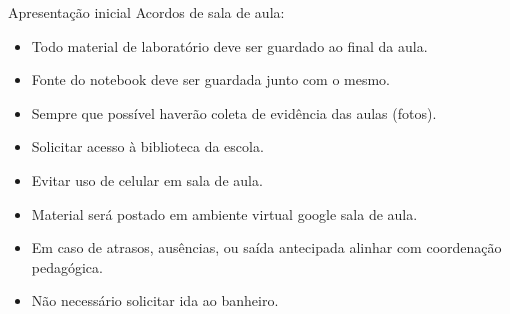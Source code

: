

\begin{frame}{Apresentação inicial}
    Acordos de sala de aula:
    \begin{itemize}
        \item Todo material de laboratório deve ser guardado ao final da aula.
        \item Fonte do notebook deve ser guardada junto com o mesmo.
        \item Sempre que possível haverão coleta de evidência das aulas (fotos).
        \item Solicitar acesso à biblioteca da escola.
        \item Evitar uso de celular em sala de aula.
        \item Material será postado em ambiente virtual google sala de aula.
        \item Em caso de atrasos, ausências, ou saída antecipada alinhar com coordenação pedagógica.
        \item Não necessário solicitar ida ao banheiro.
    \end{itemize}
\end{frame}
